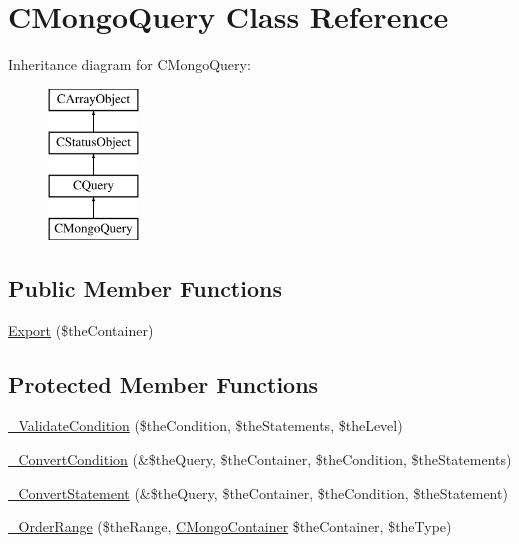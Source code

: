 \hypertarget{class_c_mongo_query}{\section{C\-Mongo\-Query Class Reference}
\label{class_c_mongo_query}
}
Inheritance diagram for C\-Mongo\-Query\-:\begin{figure}[H]
\begin{center}
\leavevmode
\includegraphics[height=4.000000cm]{class_c_mongo_query}
\end{center}
\end{figure}
\subsection*{Public Member Functions}
\begin{DoxyCompactItemize}
\item 
\hyperlink{class_c_mongo_query_aa25b073480c02f12b91bf262071fa884}{Export} (\$the\-Container)
\end{DoxyCompactItemize}
\subsection*{Protected Member Functions}
\begin{DoxyCompactItemize}
\item 
\hyperlink{class_c_mongo_query_a651af70656cb9894ef1885a711a0c141}{\-\_\-\-Validate\-Condition} (\$the\-Condition, \$the\-Statements, \$the\-Level)
\item 
\hyperlink{class_c_mongo_query_a8cda9306ac308f5c33456e77de004ebb}{\-\_\-\-Convert\-Condition} (\&\$the\-Query, \$the\-Container, \$the\-Condition, \$the\-Statements)
\item 
\hyperlink{class_c_mongo_query_a1f381db3f898f4c9cd333ffd2e3e989b}{\-\_\-\-Convert\-Statement} (\&\$the\-Query, \$the\-Container, \$the\-Condition, \$the\-Statement)
\item 
\hyperlink{class_c_mongo_query_a32fd372e1c39add42d078441eda3f1c3}{\-\_\-\-Order\-Range} (\$the\-Range, \hyperlink{class_c_mongo_container}{C\-Mongo\-Container} \$the\-Container, \$the\-Type)
\end{DoxyCompactItemize}
